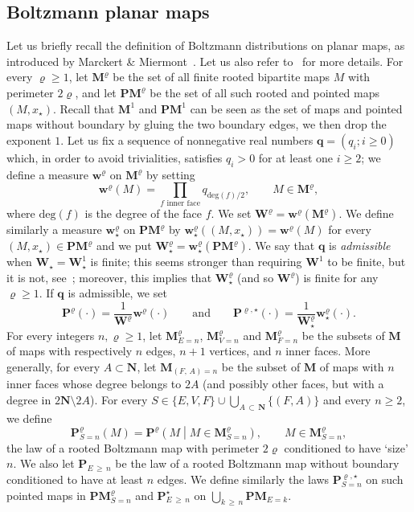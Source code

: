 \documentclass[AHL,Unicode,longabstracts,published]{cedram}
\newcommand{\ensembles}[1]{\mathbf{#1}}
\newcommand{\N}{\ensembles{N}}
\renewcommand{\P}{\ensembles{P}}
\newcommand{\1}{\ensembles{1}}
\newcommand{\q}{\mathbf{q}}
\newcommand{\Map}{\mathbf{M}}
\newcommand{\PMap}{\mathbf{PM}}
\newcommand{\bfW}{\mathbf{W}}
\newcommand{\bfww}{\mathbf{w}}
\renewcommand{\ge}{\geqslant}
\newcommand{\degl}{\mathrm{deg}}
\begin{document}
\subsection{Boltzmann planar maps}\label{sec:Boltzmann}

Let us briefly recall the definition of Boltzmann distributions on planar maps, as introduced by Marckert \& Miermont~\cite{MM07}. Let us also refer to~\cite{BM17} for more details. For every $\varrho \ge 1$, let $\Map^{\varrho}$ be the set of all finite rooted bipartite maps $M$ with perimeter $2\varrho$, and let $\PMap^{\varrho}$ be the set of all such rooted and pointed maps $(M, x_\star)$. Recall that $\Map^1$ and $\PMap^1$ can be seen as the set of maps and pointed maps without boundary by gluing the two boundary edges, we then drop the exponent $1$. Let us fix a sequence of nonnegative real numbers $\q = (q_i ; i \ge 0)$ which, in order to avoid trivialities, satisfies $q_i > 0$ for at least one $i \ge 2$; we define a measure $\bfww^{\varrho}$ on $\Map^{\varrho}$ by setting
\[
\bfww^{\varrho}(M) = \prod_{f \text{ inner face}} q_{\degl(f)/2},
\qquad M \in \Map^{\varrho},
\]
where $\degl(f)$ is the degree of the face $f$. We set $\bfW^{\varrho} = \bfww^{\varrho}(\Map^{\varrho})$. We define similarly a measure $\bfww^{\varrho}_\star$ on $\PMap^{\varrho}$ by $\bfww^{\varrho}_\star((M, x_\star)) = \bfww^{\varrho}(M)$ for every $(M, x_\star) \in \PMap^{\varrho}$ and we put $\bfW^{\varrho}_\star = \bfww^{\varrho}_\star(\PMap^{\varrho})$. We say that $\q$ is \emph{admissible} when $\bfW_\star = \bfW_\star^1$ is finite; this seems stronger than requiring $\bfW^1$ to be finite, but it is not, see~\cite{BCM19}; moreover, this implies that $\bfW^\varrho_\star$ (and so $\bfW^\varrho$) is finite for any $\varrho \ge 1$. If $\q$ is admissible, we set
\[
\P^\varrho(\cdot) = \frac{1}{\bfW^\varrho} \bfww^\varrho(\cdot)
\qquad\text{and}\qquad
\P^{\varrho, \star}(\cdot) = \frac{1}{\bfW^\varrho_\star} \bfww^\varrho_\star(\cdot).
\]
For every integers $n, \varrho \ge 1$, let $\Map^\varrho_{E=n}$, $\Map^\varrho_{V=n}$ and $\Map^\varrho_{F=n}$ be the subsets of $\Map$ of maps with respectively $n$ edges, $n+1$ vertices, and $n$ inner faces. More generally, for every $A \subset \N$, let $\Map_{(F,\,A)=n}$ be the subset of $\Map$ of maps with $n$ inner faces whose degree belongs to $2A$ (and possibly other faces, but with a degree in $2\N \setminus 2A$). For every $S \in \{E, V, F\} \cup \bigcup_{A\,\subset\, \N} \{(F,A)\}$ and every $n \ge 2$, we define
\[
\P^\varrho_{S=n}(M) = \P^\varrho\left(M \middle| M \in \Map^\varrho_{S=n}\right),
\qquad M \in \Map^\varrho_{S=n},
\]
the law of a rooted Boltzmann map with perimeter $2 \varrho$ conditioned to have `size' $n$. We also let $\P_{E\,\ge\,n}$ be the law of a rooted Boltzmann map without boundary conditioned to have at least $n$ edges. We define similarly the laws $\P^{\varrho, \star}_{S=n}$ on such pointed maps in $\PMap^\varrho_{S=n}$ and $\P^\star_{E\,\ge\,n}$ on $\bigcup_{k\,\ge\,n} \PMap_{E=k}$.
\end{document}
